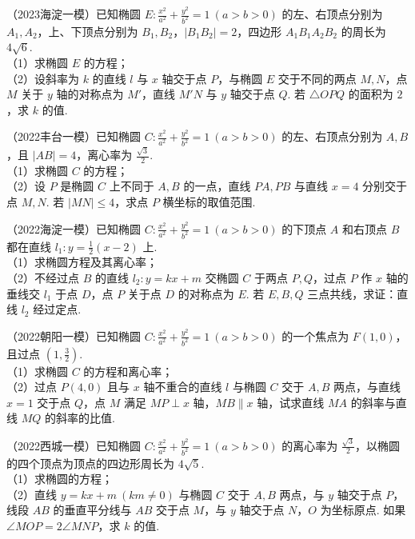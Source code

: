 \begin{example} %
（2023海淀一模）已知椭圆 $E:\frac{x^2}{a^2}+\frac{y^2}{b^2}=1\ (a>b>0)$ 的左、右顶点分别为 $A_1,A_2$，上、下顶点分别为 $B_1,B_2$，$\lvert B_1B_2\rvert=2$，四边形 $A_1B_1A_2B_2$ 的周长为 $4\sqrt{6}$.\\
（1）求椭圆 $E$ 的方程；\\
（2）设斜率为 $k$ 的直线 $l$ 与 $x$ 轴交于点 $P$，与椭圆 $E$ 交于不同的两点 $M,N$，点 $M$ 关于 $y$ 轴的对称点为 $M'$，直线 $M'N$ 与 $y$ 轴交于点 $Q$. 若 $\triangle OPQ$ 的面积为 $2$，求 $k$ 的值.
\end{example}

\begin{example} %
（2022丰台一模）已知椭圆 $C:\frac{x^2}{a^2}+\frac{y^2}{b^2}=1\ (a>b>0)$ 的左、右顶点分别为 $A,B$，且 $\lvert AB\rvert=4$，离心率为 $\frac{\sqrt{3}}{2}$.\\
（1）求椭圆 $C$ 的方程；\\
（2）设 $P$ 是椭圆 $C$ 上不同于 $A,B$ 的一点，直线 $PA,PB$ 与直线 $x=4$ 分别交于点 $M,N$. 若 $\lvert MN\rvert\leq4$，求点 $P$ 横坐标的取值范围.
\end{example}

\begin{example} %
（2022海淀一模）已知椭圆 $C:\frac{x^2}{a^2}+\frac{y^2}{b^2}=1\ (a>b>0)$ 的下顶点 $A$ 和右顶点 $B$ 都在直线 $l_1:y=\frac{1}{2}(x-2)$ 上.\\
（1）求椭圆方程及其离心率；\\
（2）不经过点 $B$ 的直线 $l_2:y=kx+m$ 交椭圆 $C$ 于两点 $P,Q$，过点 $P$ 作 $x$ 轴的垂线交 $l_1$ 于点 $D$，点 $P$ 关于点 $D$ 的对称点为 $E$. 若 $E,B,Q$ 三点共线，求证：直线 $l_2$ 经过定点.
\end{example}

\begin{example} %
（2022朝阳一模）已知椭圆 $C:\frac{x^2}{a^2}+\frac{y^2}{b^2}=1\ (a>b>0)$ 的一个焦点为 $F(1,0)$，且过点 $\left(1,\frac{3}{2}\right)$.\\
（1）求椭圆 $C$ 的方程和离心率；\\
（2）过点 $P(4,0)$ 且与 $x$ 轴不重合的直线 $l$ 与椭圆 $C$ 交于 $A,B$ 两点，与直线 $x=1$ 交于点 $Q$，点 $M$ 满足 $MP\perp x$ 轴，$MB\parallel x$ 轴，试求直线 $MA$ 的斜率与直线 $MQ$ 的斜率的比值.
\end{example}

\begin{example} %
（2022西城一模）已知椭圆 $C:\frac{x^2}{a^2}+\frac{y^2}{b^2}=1\ (a>b>0)$ 的离心率为 $\frac{\sqrt{3}}{2}$，以椭圆的四个顶点为顶点的四边形周长为 $4\sqrt{5}$.\\
（1）求椭圆的方程；\\
（2）直线 $y=kx+m\ (km\neq0)$ 与椭圆 $C$ 交于 $A,B$ 两点，与 $y$ 轴交于点 $P$，线段 $AB$ 的垂直平分线与 $AB$ 交于点 $M$，与 $y$ 轴交于点 $N$，$O$ 为坐标原点. 如果 $\angle MOP=2\angle MNP$，求 $k$ 的值.
\end{example}

